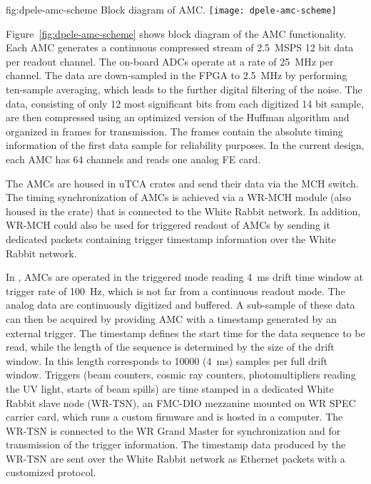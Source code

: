 \begin{dunefigure}{fig:dpele-amc-scheme}
{Block diagram of AMC.}
\texttt{[image: dpele-amc-scheme]}
\end{dunefigure}
Figure~\ref{fig:dpele-amc-scheme} shows block diagram of the AMC functionality. Each AMC generates a continuous compressed stream of \SI{2.5}{MSPS} 12 bit data per readout channel. The on-board ADCs operate at a rate of \SI{25}{\MHz} per channel. The data are down-sampled in the FPGA to \SI{2.5}{\MHz} by performing ten-sample averaging, which leads to the further digital filtering of the noise. The data, consisting of only \num{12} most significant bits from each digitized 14 bit sample, are then compressed using an optimized version of the Huffman algorithm and organized in frames for transmission.  The frames contain the absolute timing information of the first data sample for reliability purposes. In the current design, each AMC has 64 channels and reads one analog FE card.

The AMCs are housed in uTCA crates and send their data via the MCH switch. The timing synchronization of AMCs is achieved via a WR-MCH module (also housed in the crate) that is connected to the White Rabbit network. In addition, WR-MCH could also be used for triggered readout of AMCs by sending it dedicated packets containing trigger timestamp information over the White Rabbit network.

In , AMCs are operated in the triggered mode reading \SI{4}{\milli\second} drift time window at trigger rate of \SI{100}{Hz}, which is not far from a continuous readout mode. The analog data are continuously digitized and buffered. A sub-sample of these data can then be acquired by providing AMC with a timestamp generated by an external trigger. The timestamp defines the start time for the data sequence to be read, while the length of the sequence is determined by the size of the drift window. In  this length corresponds to \num{10000} (\SI{4}{\milli\second}) samples per full drift window.  Triggers (beam counters, cosmic ray counters, photomultipliers reading the UV light, starts of beam spills) are time stamped in a dedicated White Rabbit slave node (WR-TSN), an FMC-DIO mezzanine mounted on WR SPEC carrier card, which runs a custom firmware and is hosted in a computer. The WR-TSN is connected to the WR Grand Master for synchronization and for transmission of the trigger information. The timestamp data produced by the WR-TSN are sent over the White Rabbit network as Ethernet packets with a customized protocol. 

